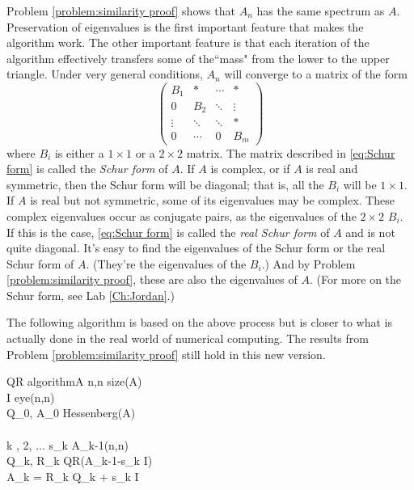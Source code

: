 Problem \ref{problem:similarity proof} shows that $A_n$ has the same spectrum as $A$. Preservation of eigenvalues is the first important feature that makes the algorithm work. The other important feature is that each iteration of the algorithm effectively transfers some of the``mass" from the lower to the upper triangle. Under very general conditions, $A_n$ will converge to a matrix of the form
\begin{equation}
\label{eq:Schur form}
     \begin{pmatrix}
          B_1 &* & \cdots & * \\
           0     &B_2  &  \ddots & \vdots \\
           \vdots  & \ddots & \ddots & *  \\
           0 & \cdots & 0 & B_m
    \end{pmatrix}
\end{equation}
where $B_i$ is either a $1 \times 1$ or a $2 \times 2$ matrix. The matrix described in \eqref{eq:Schur form} is called the \emph{Schur form} of $A$. If $A$ is complex, or if $A$ is real and symmetric, then the Schur form will be diagonal; that is, all the $B_i$ will be $1 \times 1$. If $A$ is real but not symmetric, some of its eigenvalues may be complex. These complex eigenvalues occur as conjugate pairs, as the eigenvalues of the $2 \times 2$ $B_i$. If this is the case, \eqref{eq:Schur form} is called the \emph{real Schur form} of $A$ and is not quite diagonal. It's easy to find the eigenvalues of the Schur form or the real Schur form of $A$. (They're the eigenvalues of the $B_i$.) And by Problem \ref{problem:similarity proof}, these are also the eigenvalues of $A$.
(For more on the Schur form, see Lab \ref{Ch:Jordan}.)

The following algorithm is based on the above process but is closer to what is actually done in the real world of numerical computing. The results from Problem \ref{problem:similarity proof} still hold in this new version.

\begin{pseudo}{QR algorithm}{A}
\label{Alg:QR algorithm}
n,n \GETS size(A)\\
I \GETS eye(n,n)\\
Q_0, A_0 \GETS Hessenberg(A)\\
\\
\FOR k , 2, ... \DO
\BEGIN
	s_k \GETS A_{k-1}(n,n)\\
	Q_k, R_k \GETS QR(A_{k-1}-s_k I)\\
	A_k = R_k Q_k + s_k I
\END
\end{pseudo}

